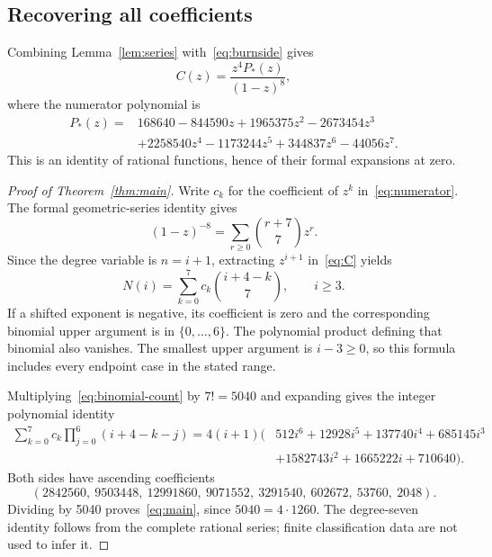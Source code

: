 \documentclass[11pt]{article}
\theoremstyle{remark}
\numberwithin{equation}{section}
\begin{document}
\subsection{Recovering all coefficients}

Combining Lemma~\ref{lem:series} with~\eqref{eq:burnside} gives
\begin{equation}\label{eq:C}
 C(z)=\frac{z^4 P_*(z)}{(1-z)^8},
\end{equation}
where the numerator polynomial is
\begin{equation}\label{eq:numerator}
\begin{split}
 P_*(z)={}&168640-844590z+1965375z^2-2673454z^3\\
          &+2258540z^4-1173244z^5+344837z^6-44056z^7.
\end{split}
\end{equation}
This is an identity of rational functions, hence of their formal
expansions at zero.

\begin{proof}[Proof of Theorem~\ref{thm:main}]
Write $c_k$ for the coefficient of $z^k$ in~\eqref{eq:numerator}.
The formal geometric-series identity gives
\[
 (1-z)^{-8}=\sum_{r\geq0}\binom{r+7}{7}z^r.
\]
Since the degree variable is $n=i+1$, extracting $z^{i+1}$
in~\eqref{eq:C} yields
\begin{equation}\label{eq:binomial-count}
 N(i)=\sum_{k=0}^7 c_k\binom{i+4-k}{7},\qquad i\geq3.
\end{equation}
If a shifted exponent is negative, its coefficient is zero and the
corresponding binomial upper argument is in $\{0,\ldots,6\}$.
The polynomial product defining that binomial also vanishes.
The smallest upper argument is $i-3\geq0$, so this formula includes every
endpoint case in the stated range.

Multiplying~\eqref{eq:binomial-count} by $7!=5040$ and expanding gives the
integer polynomial identity
\begin{equation}\label{eq:polynomial-identity}
\begin{split}
 \sum_{k=0}^7 c_k\prod_{j=0}^6(i+4-k-j)
 =4(i+1)\bigl(&512i^6+12928i^5+137740i^4+685145i^3\\
             &+1582743i^2+1665222i+710640\bigr).
\end{split}
\end{equation}
Both sides have ascending coefficients
\[
 (2842560,\ 9503448,\ 12991860,\ 9071552,\
   3291540,\ 602672,\ 53760,\ 2048).
\]
Dividing by 5040 proves~\eqref{eq:main}, since $5040=4\cdot1260$.
The degree-seven identity follows from the complete rational series;
finite classification data are not used to infer it.
\end{proof}
\end{document}
